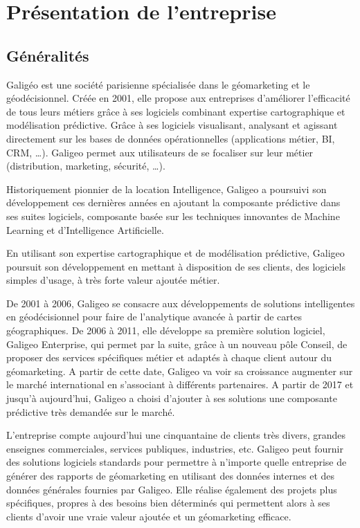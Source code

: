 
\section{Présentation de l'entreprise}

\subsection{Généralités}

Galigéo est une société parisienne spécialisée dans le géomarketing et le géodécisionnel. Créée en 2001, elle propose aux entreprises d’améliorer l’efficacité de tous leurs métiers grâce à ses logiciels combinant expertise cartographique et modélisation prédictive. Grâce à ses logiciels visualisant, analysant et agissant directement sur les bases de données opérationnelles (applications métier, BI, CRM, …). Galigeo permet aux utilisateurs de se focaliser sur leur métier (distribution, marketing, sécurité, …).

Historiquement pionnier de la location Intelligence, Galigeo a poursuivi son développement ces dernières années en ajoutant la composante prédictive dans ses suites logiciels, composante basée sur les techniques innovantes de Machine Learning et d’Intelligence Artificielle.

En utilisant son expertise cartographique et de modélisation prédictive, Galigeo poursuit son développement en mettant à disposition de ses clients, des logiciels simples d’usage, à très forte valeur ajoutée métier.

De 2001 à 2006, Galigeo se consacre aux développements de solutions intelligentes en géodécisionnel pour faire de l'analytique avancée à partir de cartes géographiques. De 2006 à 2011, elle développe sa première solution logiciel, Galigeo Enterprise, qui permet par la suite, grâce à un nouveau pôle Conseil, de proposer des services spécifiques métier et adaptés à chaque client autour du géomarketing. A partir de cette date, Galigeo va voir sa croissance augmenter sur le marché international en s'associant à différents partenaires. A partir de 2017 et jusqu'à aujourd'hui, Galigeo a choisi d'ajouter à ses solutions une composante prédictive très demandée sur le marché.

L'entreprise compte aujourd'hui une cinquantaine de clients très divers, grandes enseignes commerciales, services publiques, industries, etc. Galigeo peut fournir des solutions logiciels standards pour permettre à n’importe quelle entreprise de générer des rapports de géomarketing en utilisant des données internes et des données générales fournies par Galigeo. Elle réalise également des projets plus spécifiques, propres à des besoins bien déterminés qui permettent alors à ses clients d’avoir une vraie valeur ajoutée et un géomarketing efficace.

